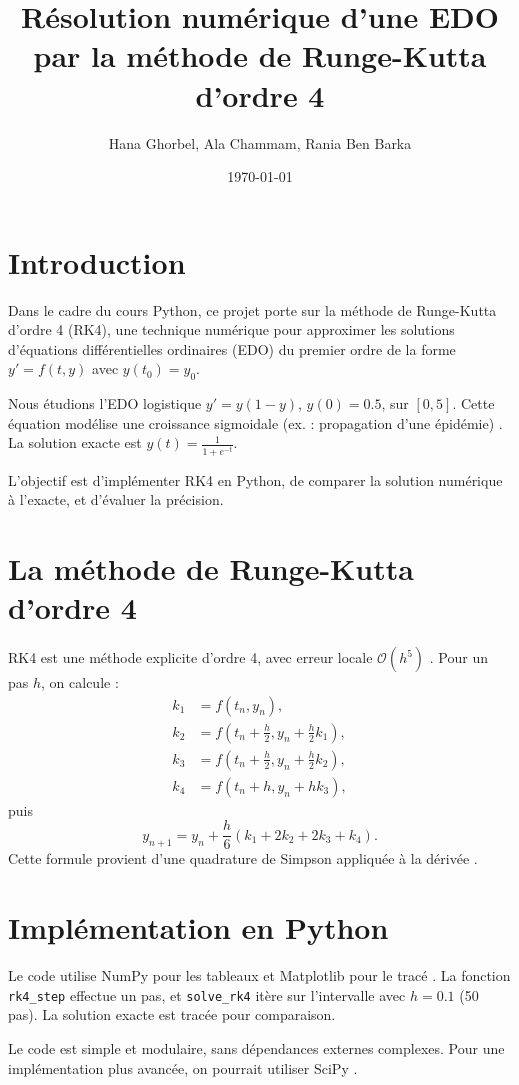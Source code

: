 \documentclass[12pt,a4paper]{article}
\title{Résolution numérique d'une EDO par la méthode de Runge-Kutta d'ordre 4}
\author{Hana Ghorbel, Ala Chammam, Rania Ben Barka}
\date{\today}
\begin{document}
\maketitle
\newpage

\section{Introduction}
Dans le cadre du cours Python, ce projet porte sur la méthode de Runge-Kutta d'ordre 4 (RK4), une technique numérique pour approximer les solutions d'équations différentielles ordinaires (EDO) du premier ordre de la forme $y' = f(t, y)$ avec $y(t_0) = y_0$.

Nous étudions l'EDO logistique $y' = y(1 - y)$, $y(0) = 0.5$, sur $[0, 5]$. Cette équation modélise une croissance sigmoidale (ex. : propagation d'une épidémie) \cite{verhulst}. La solution exacte est $y(t) = \frac{1}{1 + e^{-t}}$.

L'objectif est d'implémenter RK4 en Python, de comparer la solution numérique à l'exacte, et d'évaluer la précision.

\section{La méthode de Runge-Kutta d'ordre 4}
RK4 est une méthode explicite d'ordre 4, avec erreur locale $\mathcal{O}(h^5)$ \cite{butcher}. Pour un pas $h$, on calcule :
\begin{align*}
k_1 &= f(t_n, y_n), \\
k_2 &= f\left(t_n + \frac{h}{2}, y_n + \frac{h}{2} k_1\right), \\
k_3 &= f\left(t_n + \frac{h}{2}, y_n + \frac{h}{2} k_2\right), \\
k_4 &= f(t_n + h, y_n + h k_3),
\end{align*}
puis
\[
y_{n+1} = y_n + \frac{h}{6} (k_1 + 2k_2 + 2k_3 + k_4).
\]
Cette formule provient d'une quadrature de Simpson appliquée à la dérivée \cite{hairer}.

\section{Implémentation en Python}
Le code utilise NumPy pour les tableaux et Matplotlib pour le tracé \cite{numpy,matplotlib}. La fonction \texttt{rk4\_step} effectue un pas, et \texttt{solve\_rk4} itère sur l'intervalle avec $h = 0.1$ (50 pas). La solution exacte est tracée pour comparaison.

Le code est simple et modulaire, sans dépendances externes complexes. Pour une implémentation plus avancée, on pourrait utiliser SciPy \cite{scipy}.
\end{document}
